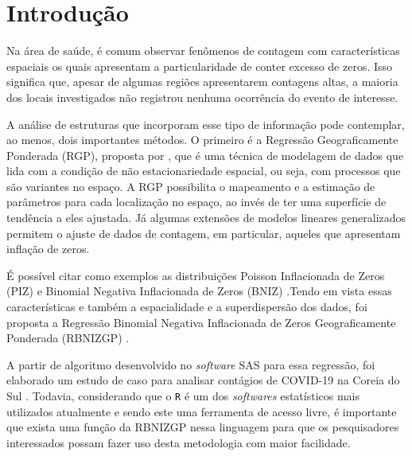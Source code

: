 \documentclass[12pt, a4paper, twoside]{report}
\numberwithin{equation}{section} %
\begin{document}
\listoftables

\newpage

\listoffigures

\newpage

\tableofcontents

\newpage

\setcounter{page}{8}

\chapter{Introdução}

Na área de saúde, é comum observar fenômenos de contagem com características espaciais os quais apresentam a particularidade de conter excesso de zeros. Isso significa que, apesar de algumas regiões apresentarem contagens altas, a maioria dos locais investigados não registrou nenhuma ocorrência do evento de interesse.

A análise de estruturas que incorporam esse tipo de informação pode contemplar, ao menos, dois importantes métodos. O primeiro é a Regressão Geograficamente Ponderada (RGP), proposta por \cite{brunsdon1996}, que é uma técnica de modelagem de dados que lida com a condição de não estacionariedade espacial, ou seja, com processos que são variantes no espaço. A RGP possibilita o mapeamento e a estimação de parâmetros para cada localização no espaço, ao invés de ter uma superfície de tendência a eles ajustada. Já algumas extensões de modelos lineares generalizados \citep{nelder1972generalized} permitem o ajuste de dados de contagem, em particular, aqueles que apresentam inflação de zeros. 

É possível citar como exemplos as distribuições Poisson Inflacionada de Zeros (PIZ) \citep{Lambert1992} e Binomial Negativa Inflacionada de Zeros (BNIZ) \citep{hall2000zero,garay2011estimation,yau2003zero}.Tendo em vista essas características e também a espacialidade e a superdispersão dos dados, foi proposta a Regressão Binomial Negativa Inflacionada de Zeros Geograficamente Ponderada (RBNIZGP) \citep{dasilva2023}. 

A partir de algoritmo desenvolvido no \textit{software} SAS para essa regressão, foi elaborado um estudo de caso para analisar contágios de COVID-19 na Coreia do Sul \citep{weinstein2021precision}. Todavia,  considerando que o \texttt{R} é um dos \textit{softwares} estatísticos mais utilizados atualmente e sendo este uma ferramenta de acesso livre, é importante que exista uma função da RBNIZGP nessa linguagem para que os pesquisadores interessados possam fazer uso desta metodologia com maior facilidade.
\end{document}

